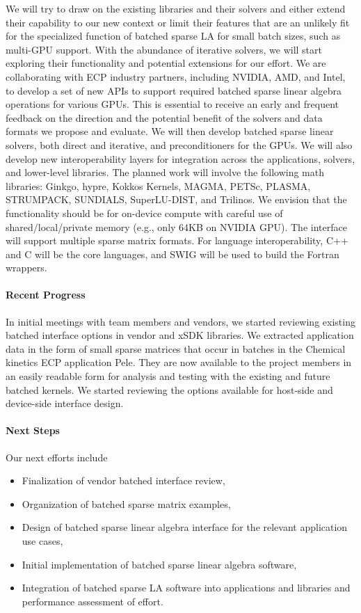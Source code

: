 We will try to draw on the existing libraries and their solvers and
either extend their capability to our new context or limit their
features that are an unlikely fit for the specialized function of
batched sparse LA for small batch sizes, such as multi-GPU support.
With the abundance of iterative solvers, we will
start exploring their functionality and potential extensions for our
effort.
We are collaborating with ECP industry partners, including NVIDIA, AMD,
and Intel, to develop a set of new APIs to support required batched
sparse linear algebra operations for various GPUs. This is essential to
receive an early and frequent feedback on the direction and the
potential benefit of the solvers and data formats we propose and
evaluate.
We will then develop batched sparse linear solvers, both direct and
iterative, and preconditioners for the GPUs. We will also develop new
interoperability layers for integration across the applications,
solvers, and lower-level libraries. The planned work will involve the
following math libraries: Ginkgo, hypre, Kokkos Kernels, MAGMA, PETSc,
PLASMA, STRUMPACK, SUNDIALS, SuperLU-DIST, and Trilinos.
We envision that the functionality
should be for on-device compute with careful use of shared/local/private
memory (e.g., only 64KB on NVIDIA GPU). The interface will support
multiple sparse matrix formats. For language interoperability, C++ and C
will be the core languages, and SWIG will be used to build the Fortran
wrappers.

\paragraph{Recent Progress}

In initial meetings with team members and vendors, we started reviewing existing batched
interface options in vendor and xSDK libraries.
We extracted application data in the form of small sparse matrices that
occur in batches in the Chemical kinetics ECP application Pele. They are now available to the
project members in an easily readable form for analysis and testing with
the existing and future batched kernels.
We started reviewing the options available for host-side and device-side
interface design.

\paragraph{Next Steps}

Our next efforts include
\begin{itemize}
\item Finalization of vendor batched interface review,
\item Organization of batched sparse matrix examples,
\item Design of batched sparse linear algebra interface for the relevant application use cases,
\item Initial implementation of batched sparse linear algebra software,
\item Integration of batched sparse LA software into applications and libraries and performance assessment of effort.
\end{itemize}